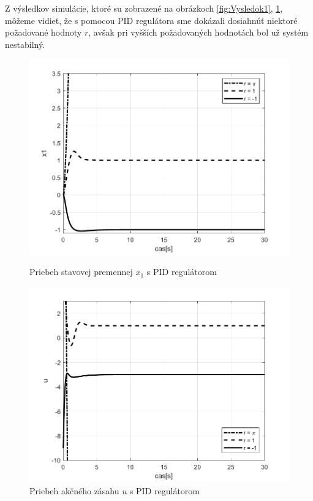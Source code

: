 \documentclass[../main.tex]{subfiles}
\begin{document}
Z výsledkov simulácie, ktoré su zobrazené na obrázkoch \ref{fig:Vysledok1}, \ref{fig:Vysledok2}, môžeme vidieť, že s pomocou PID regulátora sme dokázali dosiahnúť niektoré požadované hodnoty $r$, avšak pri vyšších požadovaných hodnotách bol už systém nestabilný.
\begin{figure}[!htb]
   \begin{minipage}{0.46\textwidth}
     \centering
     \includegraphics[width=1\linewidth]{xpid.pdf}
     \caption{Priebeh stavovej premennej $x_1$ s PID regulátorom}
	\label{fig:Vysledok1}
   \end{minipage}\hfill
   \begin{minipage}{0.46\textwidth}
     \centering
     \includegraphics[width=1\linewidth]{upid.pdf}
     \caption{Priebeh akčného zásahu $u$ s PID regulátorom}
	\label{fig:Vysledok2}
   \end{minipage}
\end{figure}
\end{document}
